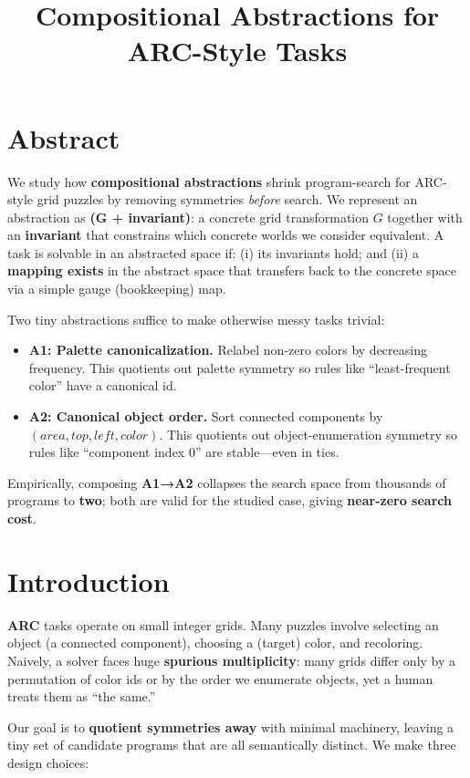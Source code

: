 \documentclass[11pt]{article}
\title{Compositional Abstractions for ARC-Style Tasks}
\author{}
\date{}
\begin{document}
\maketitle

\section{Abstract}

We study how \textbf{compositional abstractions} shrink program-search for ARC-style grid puzzles by removing symmetries \emph{before} search. We represent an abstraction as \textbf{(G + invariant)}: a concrete grid transformation $G$ together with an \textbf{invariant} that constrains which concrete worlds we consider equivalent. A task is solvable in an abstracted space if: (i) its invariants hold; and (ii) a \textbf{mapping exists} in the abstract space that transfers back to the concrete space via a simple gauge (bookkeeping) map.

Two tiny abstractions suffice to make otherwise messy tasks trivial:
\begin{itemize}
\item \textbf{A1: Palette canonicalization.} Relabel non-zero colors by decreasing frequency. This quotients out palette symmetry so rules like ``least-frequent color'' have a canonical id.
\item \textbf{A2: Canonical object order.} Sort connected components by $(area, top, left, color)$. This quotients out object-enumeration symmetry so rules like ``component index 0'' are stable---even in ties.
\end{itemize}

Empirically, composing \textbf{A1→A2} collapses the search space from thousands of programs to \textbf{two}; both are valid for the studied case, giving \textbf{near-zero search cost}.

\section{Introduction}

\textbf{ARC} tasks operate on small integer grids. Many puzzles involve selecting an object (a connected component), choosing a (target) color, and recoloring. Naively, a solver faces huge \textbf{spurious multiplicity}: many grids differ only by a permutation of color ids or by the order we enumerate objects, yet a human treats them as ``the same.''

Our goal is to \textbf{quotient symmetries away} with minimal machinery, leaving a tiny set of candidate programs that are all semantically distinct. We make three design choices:
\end{document}
